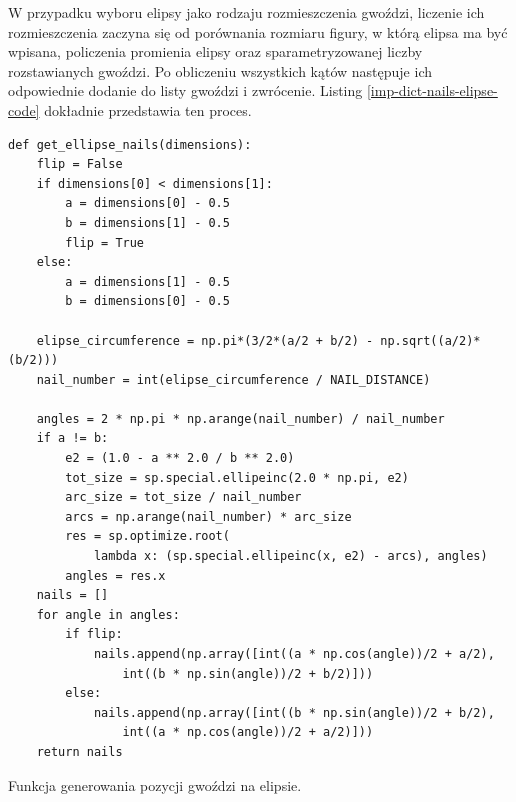         W przypadku wyboru elipsy jako rodzaju rozmieszczenia gwoździ, liczenie ich rozmieszczenia zaczyna się od porównania rozmiaru figury, w którą elipsa ma być wpisana, policzenia promienia elipsy oraz sparametryzowanej liczby rozstawianych gwoździ. Po obliczeniu wszystkich kątów następuje ich odpowiednie dodanie do listy gwoździ i zwrócenie. Listing \ref{imp-dict-nails-elipse-code} dokładnie przedstawia ten proces.
        \begin{code}[H]
        \begin{verbatim}
def get_ellipse_nails(dimensions):
    flip = False
    if dimensions[0] < dimensions[1]:
        a = dimensions[0] - 0.5
        b = dimensions[1] - 0.5
        flip = True
    else:
        a = dimensions[1] - 0.5
        b = dimensions[0] - 0.5

    elipse_circumference = np.pi*(3/2*(a/2 + b/2) - np.sqrt((a/2)*(b/2)))
    nail_number = int(elipse_circumference / NAIL_DISTANCE)

    angles = 2 * np.pi * np.arange(nail_number) / nail_number
    if a != b:
        e2 = (1.0 - a ** 2.0 / b ** 2.0)
        tot_size = sp.special.ellipeinc(2.0 * np.pi, e2)
        arc_size = tot_size / nail_number
        arcs = np.arange(nail_number) * arc_size
        res = sp.optimize.root(
            lambda x: (sp.special.ellipeinc(x, e2) - arcs), angles)
        angles = res.x 
    nails = []
    for angle in angles:
        if flip:
            nails.append(np.array([int((a * np.cos(angle))/2 + a/2), 
                int((b * np.sin(angle))/2 + b/2)]))
        else:
            nails.append(np.array([int((b * np.sin(angle))/2 + b/2), 
                int((a * np.cos(angle))/2 + a/2)]))
    return nails
        \end{verbatim}
        \caption{Funkcja generowania pozycji gwoździ na elipsie.}
        \label{imp-dict-nails-elipse-code}
        \end{code}
        
